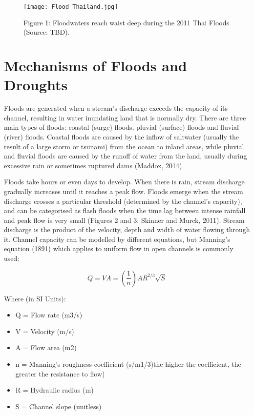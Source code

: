 \begin{figure}
	\centering
		\texttt{[image: Flood\_Thailand.jpg]}
	\caption{Figure 1: Floodwaters reach waist deep during the 2011 Thai Floods (Source: TBD).}
	\label{fig:Flood_Thailand}
\end{figure}


\section{Mechanisms of Floods and Droughts}

Floods are generated when a stream's discharge exceeds the capacity of its channel, resulting in water inundating land that is normally dry. There are three main types of floods: coastal (surge) floods, pluvial (surface) floods and fluvial (river) floods. Coastal floods are caused by the inflow of saltwater (usually the result of a large storm or tsunami) from the ocean to inland areas, while pluvial and fluvial floods are caused by the runoff of water from the land, usually during excessive rain or sometimes ruptured dams (Maddox, 2014). 

Floods take hours or even days to develop. When there is rain, stream discharge gradually increases until it reaches a peak flow. Floods emerge when the stream discharge crosses a particular threshold (determined by the channel's capacity), and can be categorised as flash floods when the time lag between intense rainfall and peak flow is very small (Figures 2 and 3; Skinner and Murck, 2011). Stream discharge is the product of the velocity, depth and width of water flowing through it. Channel capacity can be modelled by different equations, but Manning's equation (1891) which applies to uniform flow in open channels is commonly used:

\begin{equation}
Q = VA = (\frac{1}{n})AR^{2/3}\sqrt{S}
\end{equation}
 
\noindent Where (in SI Units):

\begin{itemize}
	\item Q = Flow rate (m3/s)
	\item V = Velocity (m/s)
	\item A = Flow area (m2)
	\item n = Manning's roughness coefficient (s/m1/3)the higher the coefficient, the greater the resistance to flow)
	\item R = Hydraulic radius (m)
	\item S = Channel slope (unitless)
\end{itemize}

